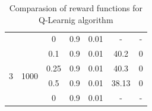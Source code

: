 \documentclass[a4paper, twoside, english]{article}
\begin{document}
\begin{table}[h!]
\begin{tabular}{ccccccc}
		&                        & 0                                    & 0.9                                & 0.01                               & -                                        & -                                   \\
		\multirow{4}{*}{3}                  & \multirow{4}{*}{1000}  & 0.1                                  & 0.9                                & 0.01                               & 40.2                                     & 0                                   \\
		&                        & 0.25                                 & 0.9                                & 0.01                               & 40.3                                     & 0                                   \\
		&                        & 0.5                                  & 0.9                                & 0.01                               & 38.13                                    & 0                                   \\
		&                        & 0                                    & 0.9                                & 0.01                               & -                                        & -                                  
	\end{tabular}
	\caption{Comparasion of reward functions for Q-Learnig algorithm}
	\label{table:2}
\end{table}
\end{document}
